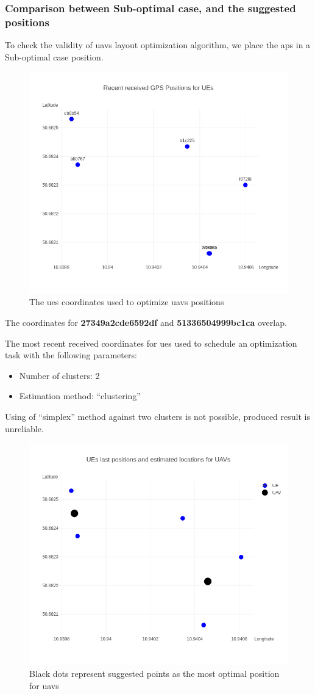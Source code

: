 \subsubsection{Comparison between Sub-optimal case, and the suggested
positions}

To check the validity of \glspl{uav} layout optimization algorithm, we place the \glspl{ap} in a Sub-optimal case position.

\begin{figure}[H]
	\centering
	\includegraphics[width=0.5\linewidth,keepaspectratio]{images/Exp4_UEs_Location_to_optimize.png}
\caption{The \glspl{ue} coordinates used to optimize \glspl{uav} positions}
\end{figure}

The coordinates for \textbf{27349a2cde6592df} and
\textbf{51336504999bc1ca} overlap.

The most recent received coordinates for \glspl{ue} used to schedule an optimization task with the following parameters:

\begin{itemize}
\tightlist
\item
  Number of clusters: 2
\item
  Estimation method: ``clustering''
\end{itemize}

Using of ``simplex'' method against two clusters is not possible, produced result is unreliable.

\begin{figure}[H]
	\centering
	\includegraphics[width=0.5\linewidth,keepaspectratio]{images/Expt4_Estimated UAVs_locations.png}
\caption{Black dots represent suggested points as the most optimal
position for \glspl{uav}}
\end{figure}

